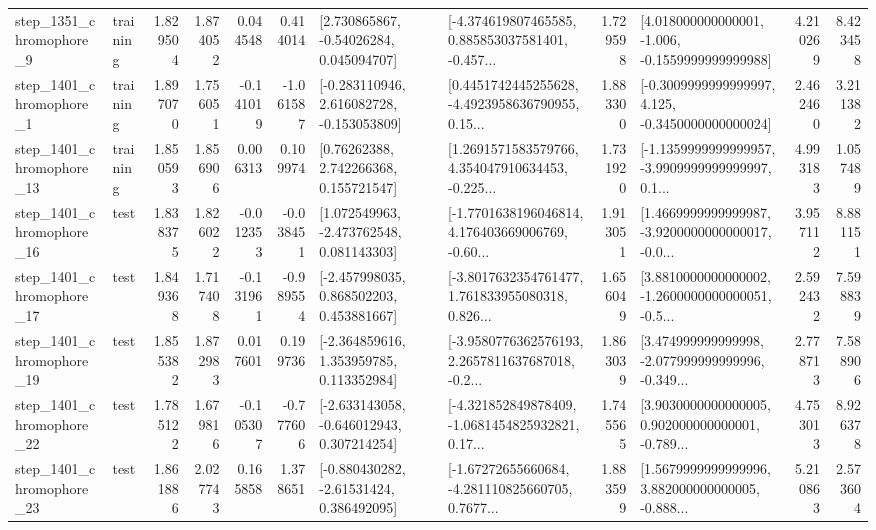 \begin{tabular}{llrrrrllrlrr}
  step\_1351\_chromophore\_9 &  training &      1.829504 &    1.874052 &      0.044548 &  0.414014 &     [2.730865867, -0.54026284, 0.045094707] &  [-4.374619807465585, 0.885853037581401, -0.457... &       1.729598 &   [4.018000000000001, -1.006, -0.1559999999999988] &            4.210269 &          8.423458 \\
  step\_1401\_chromophore\_1 &  training &      1.897070 &    1.756051 &     -0.141019 & -1.061587 &   [-0.283110946, 2.616082728, -0.153053809] &  [0.4451742445255628, -4.4923958636790955, 0.15... &       1.883300 &  [-0.3009999999999997, 4.125, -0.3450000000000024] &            2.462460 &          3.211382 \\
 step\_1401\_chromophore\_13 &  training &      1.850593 &    1.856906 &      0.006313 &  0.109974 &      [0.76262388, 2.742266368, 0.155721547] &  [1.2691571583579766, 4.354047910634453, -0.225... &       1.731920 &  [-1.1359999999999957, -3.9909999999999997, 0.1... &            4.993183 &          1.057489 \\
 step\_1401\_chromophore\_16 &      test &      1.838375 &    1.826022 &     -0.012353 & -0.038451 &    [1.072549963, -2.473762548, 0.081143303] &  [-1.7701638196046814, 4.176403669006769, -0.60... &       1.913051 &  [1.4669999999999987, -3.9200000000000017, -0.0... &            3.957112 &          8.881151 \\
 step\_1401\_chromophore\_17 &      test &      1.849368 &    1.717408 &     -0.131961 & -0.989554 &    [-2.457998035, 0.868502203, 0.453881667] &  [-3.8017632354761477, 1.761833955080318, 0.826... &       1.656049 &  [3.8810000000000002, -1.2600000000000051, -0.5... &            2.592432 &          7.598839 \\
 step\_1401\_chromophore\_19 &      test &      1.855382 &    1.872983 &      0.017601 &  0.199736 &    [-2.364859616, 1.353959785, 0.113352984] &  [-3.9580776362576193, 2.2657811637687018, -0.2... &       1.863039 &  [3.474999999999998, -2.077999999999996, -0.349... &            2.778713 &          7.588906 \\
 step\_1401\_chromophore\_22 &      test &      1.785122 &    1.679816 &     -0.105307 & -0.777606 &   [-2.633143058, -0.646012943, 0.307214254] &  [-4.321852849878409, -1.0681454825932821, 0.17... &       1.745565 &  [3.9030000000000005, 0.902000000000001, -0.789... &            4.753013 &          8.926378 \\
 step\_1401\_chromophore\_23 &      test &      1.861886 &    2.027743 &      0.165858 &  1.378651 &    [-0.880430282, -2.61531424, 0.386492095] &  [-1.67272655660684, -4.281110825660705, 0.7677... &       1.883599 &  [1.5679999999999996, 3.882000000000005, -0.888... &            5.210863 &          2.573604 \\

\end{tabular}
